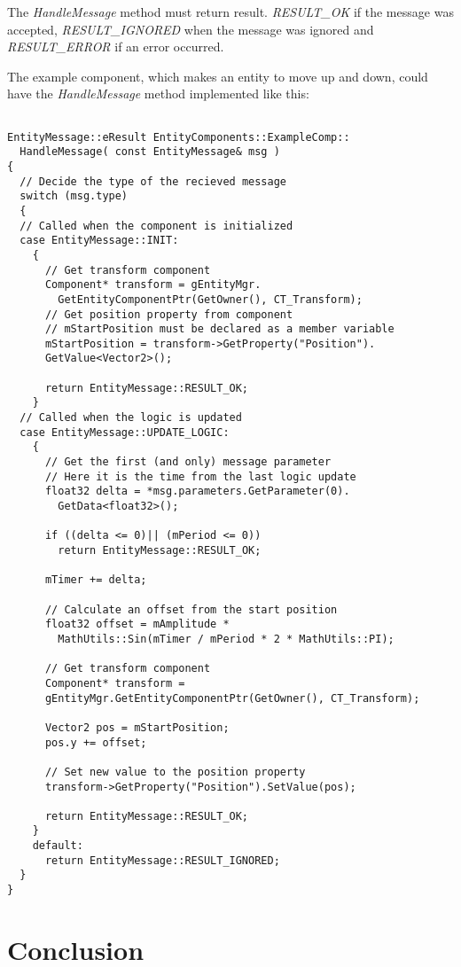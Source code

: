 \documentclass[a4paper, 12pt]{report}
\begin{document}
The \emph{HandleMessage} method must return result. \emph{RESULT\_OK} if the message was accepted, \emph{RESULT\_IGNORED} when the message was ignored and \emph{RESULT\_ERROR} if an error occurred.

The example component, which makes an entity to move up and down, could have the \emph{HandleMessage} method implemented like this:

\footnotesize 
\begin{verbatim}

EntityMessage::eResult EntityComponents::ExampleComp::
  HandleMessage( const EntityMessage& msg )
{
  // Decide the type of the recieved message
  switch (msg.type)
  {
  // Called when the component is initialized
  case EntityMessage::INIT:
    {
      // Get transform component
      Component* transform = gEntityMgr.
        GetEntityComponentPtr(GetOwner(), CT_Transform);
      // Get position property from component
      // mStartPosition must be declared as a member variable
      mStartPosition = transform->GetProperty("Position").
      GetValue<Vector2>();

      return EntityMessage::RESULT_OK;
    }
  // Called when the logic is updated
  case EntityMessage::UPDATE_LOGIC:
    {
      // Get the first (and only) message parameter
      // Here it is the time from the last logic update
      float32 delta = *msg.parameters.GetParameter(0).
        GetData<float32>();

      if ((delta <= 0)|| (mPeriod <= 0))
        return EntityMessage::RESULT_OK;

      mTimer += delta;

      // Calculate an offset from the start position
      float32 offset = mAmplitude * 
        MathUtils::Sin(mTimer / mPeriod * 2 * MathUtils::PI);

      // Get transform component
      Component* transform = 
      gEntityMgr.GetEntityComponentPtr(GetOwner(), CT_Transform);

      Vector2 pos = mStartPosition;
      pos.y += offset;

      // Set new value to the position property
      transform->GetProperty("Position").SetValue(pos);

      return EntityMessage::RESULT_OK;
    }
    default:
      return EntityMessage::RESULT_IGNORED;
  }
}
\end{verbatim}
\normalsize

\section{Conclusion}
\end{document}
